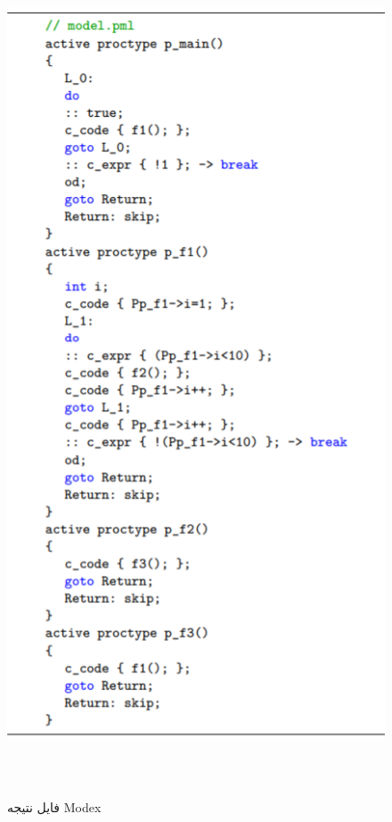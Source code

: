  \begin{figure}
	\centering
	\includegraphics[height=25cm,width=12cm]{g.png}
	\caption{فایل نتیجه Modex}
	\centering
\end{figure}

